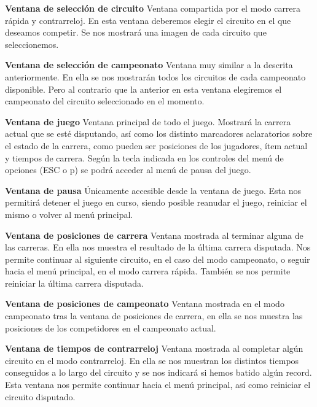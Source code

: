 \begin{description}
    \item \textbf{Ventana de selección de circuito} Ventana compartida por el modo carrera rápida y contrarreloj. En esta ventana
    deberemos elegir el circuito en el que deseamos competir. Se nos mostrará una imagen de cada circuito que seleccionemos.
    
    \item \textbf{Ventana de selección de campeonato} Ventana muy similar a la descrita anteriormente. En ella se nos mostrarán
    todos los circuitos de cada campeonato disponible. Pero al contrario que la anterior en esta ventana elegiremos el campeonato 
    del circuito seleccionado en el momento.
    
    \item \textbf{Ventana de juego} Ventana principal de todo el juego. Mostrará la carrera actual que se esté disputando, así como
    los distinto marcadores aclaratorios sobre el estado de la carrera, como
    pueden ser posiciones de los jugadores, ítem actual y
    tiempos de carrera. Según la tecla indicada en los controles del menú de opciones (ESC o p) se podrá acceder al menú
    de pausa del juego.
    
    \item \textbf{Ventana de pausa} Únicamente accesible desde la ventana de juego. Esta nos permitirá detener el juego en curso, 
    siendo posible reanudar el juego, reiniciar el mismo o volver al menú principal.
    
    \item \textbf{Ventana de posiciones de carrera} Ventana mostrada al terminar alguna de las carreras. En ella nos muestra el 
    resultado de la última carrera disputada. Nos permite continuar al siguiente circuito, en el caso del modo campeonato, o seguir
    hacia el menú principal, en el modo carrera rápida. También se nos permite
    reiniciar la última carrera disputada.
    
    \item \textbf{Ventana de posiciones de campeonato} Ventana mostrada en el modo campeonato tras la ventana de posiciones 
    de carrera, en ella se nos muestra las posiciones de los competidores en el campeonato actual.
    
    \item \textbf{Ventana de tiempos de contrarreloj} Ventana mostrada al completar algún circuito en el modo contrarreloj. En ella
    se nos muestran los distintos tiempos conseguidos a lo largo del circuito y se nos indicará si hemos batido algún record.
    Esta ventana nos permite continuar hacia el menú principal, así como reiniciar el circuito disputado.
    
\end{description}

